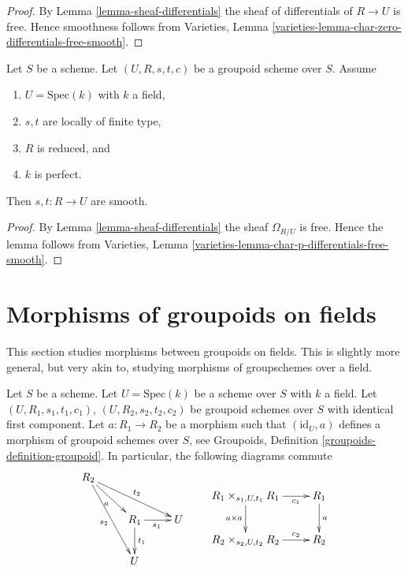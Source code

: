 \begin{proof}
By
Lemma \ref{lemma-sheaf-differentials}
the sheaf of differentials of $R \to U$ is free.
Hence smoothness follows from
Varieties, Lemma \ref{varieties-lemma-char-zero-differentials-free-smooth}.
\end{proof}

\begin{lemma}
\label{lemma-reduced-group-scheme-perfect-field-characteristic-p-smooth}
Let $S$ be a scheme. Let $(U, R, s, t, c)$ be a groupoid scheme
over $S$. Assume
\begin{enumerate}
\item $U = \text{Spec}(k)$ with $k$ a field,
\item $s, t$ are locally of finite type,
\item $R$ is reduced, and
\item $k$ is perfect.
\end{enumerate}
Then $s, t : R \to U$ are smooth.
\end{lemma}

\begin{proof}
By 
Lemma \ref{lemma-sheaf-differentials}
the sheaf $\Omega_{R/U}$ is free. Hence the lemma follows from
Varieties, Lemma \ref{varieties-lemma-char-p-differentials-free-smooth}.
\end{proof}










\section{Morphisms of groupoids on fields}
\label{section-morphisms-groupoids-on-fields}

\noindent
This section studies morphisms between groupoids on fields.
This is slightly more general, but very akin to, studying
morphisms of groupschemes over a field.

\begin{situation}
\label{situation-morphism-groupoids-on-field}
Let $S$ be a scheme.
Let $U = \text{Spec}(k)$ be a scheme over $S$ with $k$ a field.
Let $(U, R_1, s_1, t_1, c_1)$, $(U, R_2, s_2, t_2, c_2)$ be groupoid schemes
over $S$ with identical first component. Let $a : R_1 \to R_2$ be a morphism
such that $(\text{id}_U, a)$ defines a morphism of groupoid
schemes over $S$, see
Groupoids, Definition \ref{groupoids-definition-groupoid}.
In particular, the following diagrams commute
$$
\vcenter{
\xymatrix{
R_2 \ar[rrd]^{t_2} \ar[rdd]_{s_2} \ar[rd]_a \\
& R_1 \ar[d]^{t_1} \ar[r]_{s_1} & U \\
& U
}
}
\quad\quad
\vcenter{
\xymatrix{
R_1 \times_{s_1, U, t_1} R_1 \ar[r]_-{c_1} \ar[d]_{a \times a} &
R_1 \ar[d]^a \\
R_2 \times_{s_2, U, t_2} R_2 \ar[r]^-{c_2} &
R_2
}
}
$$
\end{situation}

